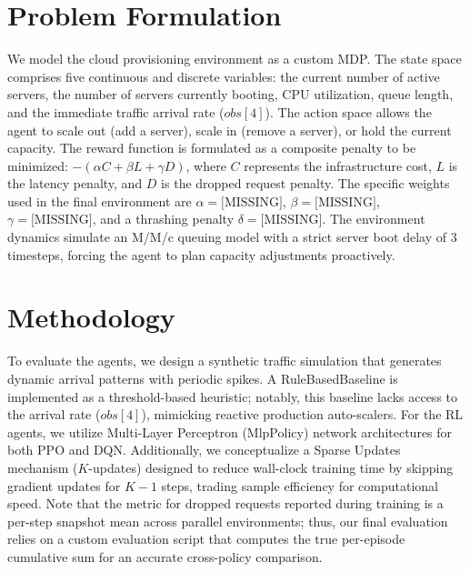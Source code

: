 \documentclass[conference]{IEEEtran}
\begin{document}
\section{Problem Formulation}
We model the cloud provisioning environment as a custom MDP. The state space comprises five continuous and discrete variables: the current number of active servers, the number of servers currently booting, CPU utilization, queue length, and the immediate traffic arrival rate ($obs[4]$). The action space allows the agent to scale out (add a server), scale in (remove a server), or hold the current capacity. The reward function is formulated as a composite penalty to be minimized: $-\left( \alpha C + \beta L + \gamma D \right)$, where $C$ represents the infrastructure cost, $L$ is the latency penalty, and $D$ is the dropped request penalty. The specific weights used in the final environment are $\alpha=\text{[MISSING]}$, $\beta=\text{[MISSING]}$, $\gamma=\text{[MISSING]}$, and a thrashing penalty $\delta=\text{[MISSING]}$. The environment dynamics simulate an M/M/c queuing model with a strict server boot delay of 3 timesteps, forcing the agent to plan capacity adjustments proactively.

\section{Methodology}
To evaluate the agents, we design a synthetic traffic simulation that generates dynamic arrival patterns with periodic spikes. A RuleBasedBaseline is implemented as a threshold-based heuristic; notably, this baseline lacks access to the arrival rate ($obs[4]$), mimicking reactive production auto-scalers. For the RL agents, we utilize Multi-Layer Perceptron (MlpPolicy) network architectures for both PPO and DQN. Additionally, we conceptualize a Sparse Updates mechanism ($K$-updates) designed to reduce wall-clock training time by skipping gradient updates for $K-1$ steps, trading sample efficiency for computational speed. Note that the metric for dropped requests reported during training is a per-step snapshot mean across parallel environments; thus, our final evaluation relies on a custom evaluation script that computes the true per-episode cumulative sum for an accurate cross-policy comparison.
\end{document}
